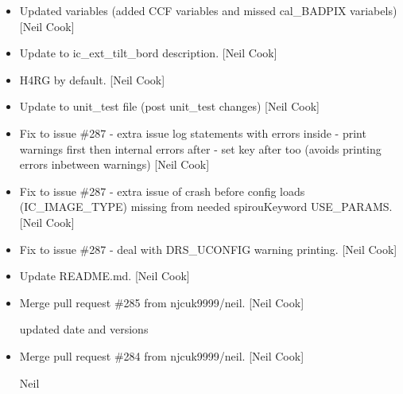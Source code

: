 \documentclass[a4paper,10pt,english]{report}
\begin{document}
\begin{itemize}
\item {} 
Updated variables (added CCF variables and missed cal\_BADPIX
variabels) {[}Neil Cook{]}

\item {} 
Update to ic\_ext\_tilt\_bord description. {[}Neil Cook{]}

\item {} 
H4RG by default. {[}Neil Cook{]}

\item {} 
Update to unit\_test file (post unit\_test changes) {[}Neil Cook{]}

\item {} 
Fix to issue \#287 - extra issue log statements with errors inside -
print warnings first then internal errors after - set key after too
(avoids printing errors inbetween warnings) {[}Neil Cook{]}

\item {} 
Fix to issue \#287 - extra issue of crash before config loads
(IC\_IMAGE\_TYPE) missing from needed spirouKeyword USE\_PARAMS. {[}Neil
Cook{]}

\item {} 
Fix to issue \#287 - deal with DRS\_UCONFIG warning printing. {[}Neil
Cook{]}

\item {} 
Update README.md. {[}Neil Cook{]}

\item {} 
Merge pull request \#285 from njcuk9999/neil. {[}Neil Cook{]}

updated date and versions

\item {} 
Merge pull request \#284 from njcuk9999/neil. {[}Neil Cook{]}

Neil

\end{itemize}
\end{document}

